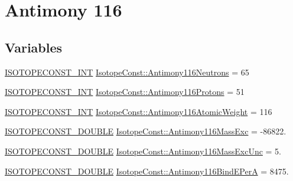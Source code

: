 \hypertarget{group___isotope_const-_antimony-_sb116}{}\section{Antimony 116}
\label{group___isotope_const-_antimony-_sb116}
\subsection*{Variables}
\begin{DoxyCompactItemize}
\item 
\mbox{\hyperlink{group___isotope_const-_macros_ga5f18360b3e99483a35c32d789e62621c}{I\+S\+O\+T\+O\+P\+E\+C\+O\+N\+S\+T\+\_\+\+I\+NT}} \mbox{\hyperlink{group___isotope_const-_antimony-_sb116_ga26f2fa926cae1e747d7b46efa9c37237}{Isotope\+Const\+::\+Antimony116\+Neutrons}} = 65
\item 
\mbox{\hyperlink{group___isotope_const-_macros_ga5f18360b3e99483a35c32d789e62621c}{I\+S\+O\+T\+O\+P\+E\+C\+O\+N\+S\+T\+\_\+\+I\+NT}} \mbox{\hyperlink{group___isotope_const-_antimony-_sb116_gafc02502e5c329a5302b67a5d07e2bb32}{Isotope\+Const\+::\+Antimony116\+Protons}} = 51
\item 
\mbox{\hyperlink{group___isotope_const-_macros_ga5f18360b3e99483a35c32d789e62621c}{I\+S\+O\+T\+O\+P\+E\+C\+O\+N\+S\+T\+\_\+\+I\+NT}} \mbox{\hyperlink{group___isotope_const-_antimony-_sb116_ga5ee9d85666ae084ef88a79a478d3381e}{Isotope\+Const\+::\+Antimony116\+Atomic\+Weight}} = 116
\item 
\mbox{\hyperlink{group___isotope_const-_macros_ga8f45a7272ce02c0b4c65c44636ed719a}{I\+S\+O\+T\+O\+P\+E\+C\+O\+N\+S\+T\+\_\+\+D\+O\+U\+B\+LE}} \mbox{\hyperlink{group___isotope_const-_antimony-_sb116_ga88545ce3a34b9378576493173e16f672}{Isotope\+Const\+::\+Antimony116\+Mass\+Exc}} = -\/86822.
\item 
\mbox{\hyperlink{group___isotope_const-_macros_ga8f45a7272ce02c0b4c65c44636ed719a}{I\+S\+O\+T\+O\+P\+E\+C\+O\+N\+S\+T\+\_\+\+D\+O\+U\+B\+LE}} \mbox{\hyperlink{group___isotope_const-_antimony-_sb116_gab176827af66afc83d036b7ded9f62ac6}{Isotope\+Const\+::\+Antimony116\+Mass\+Exc\+Unc}} = 5.
\item 
\mbox{\hyperlink{group___isotope_const-_macros_ga8f45a7272ce02c0b4c65c44636ed719a}{I\+S\+O\+T\+O\+P\+E\+C\+O\+N\+S\+T\+\_\+\+D\+O\+U\+B\+LE}} \mbox{\hyperlink{group___isotope_const-_antimony-_sb116_gab26950c445904aa795c444d41533643e}{Isotope\+Const\+::\+Antimony116\+Bind\+E\+PerA}} = 8475.
\item 

\end{DoxyCompactItemize}
